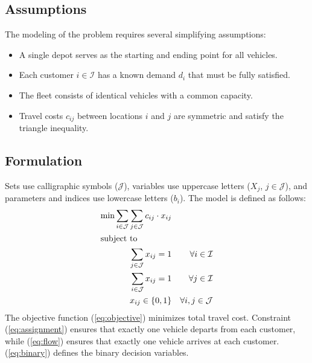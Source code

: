 \documentclass[11pt,a4paper]{article}
\begin{document}
\subsection{Assumptions}
\label{sec:assumptions}
The modeling of the problem requires several simplifying assumptions:
\begin{itemize}
	\item A single depot serves as the starting and ending point for all vehicles.
	\item Each customer $i \in \mathcal{I}$ has a known demand $d_i$ that must be fully satisfied.
	\item The fleet consists of identical vehicles with a common capacity.
	\item Travel costs $c_{ij}$ between locations $i$ and $j$ are symmetric and satisfy the triangle inequality.
\end{itemize}

%
\subsection{Formulation}
\label{sec:formulation}
Sets use calligraphic symbols ($\mathcal{J}$), variables use uppercase letters ($X_j$, $j \in \mathcal{J}$), and parameters and indices use lowercase letters ($b_i$).
The model is defined as follows:
\begin{align}
	\label{eq:objective}
	\min \sum_{i \in \mathcal{J}} \sum_{j \in \mathcal{J}} c_{ij} \cdot x_{ij} & \\
	\intertext{subject to}
	\label{eq:assignment}
	\sum_{j \in \mathcal{J}} x_{ij} = 1 && \forall i \in \mathcal{I} \\
	\label{eq:flow}
	\sum_{i \in \mathcal{J}} x_{ij} = 1 && \forall j \in \mathcal{I} \\
	\label{eq:binary}
	x_{ij} \in \{0, 1\} && \forall i, j \in \mathcal{J}
\end{align}
The objective function (\ref{eq:objective}) minimizes total travel cost. Constraint (\ref{eq:assignment}) ensures that exactly one vehicle departs from each customer, while (\ref{eq:flow}) ensures that exactly one vehicle arrives at each customer. (\ref{eq:binary}) defines the binary decision variables.
\end{document}
